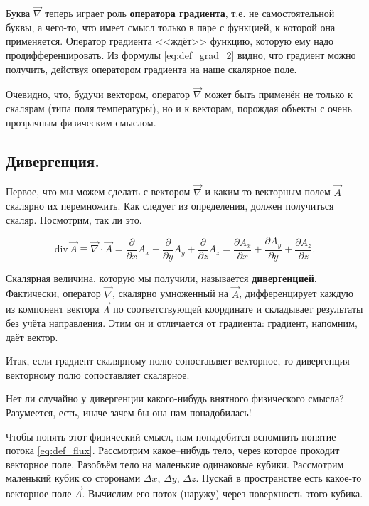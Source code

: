 \documentclass[12pt,a4paper]{article}
\numberwithin{equation}{section}
\numberwithin{equation}{section}
\newcommand{\pt}{\partial}
\renewcommand{\div}{\mathrm{div}\,}
\begin{document}
Буква $\vec{\nabla}$ теперь играет роль \textbf{оператора градиента},
т.е. не самостоятельной буквы, а чего-то, что имеет смысл только в
паре с функцией, к которой она применяется. Оператор градиента
<<ждёт>> функцию, которую ему надо продифференцировать. Из формулы
\eqref{eq:def_grad_2} видно, что градиент можно получить, действуя
оператором градиента на наше скалярное поле.

Очевидно, что, будучи вектором, оператор $\vec{\nabla}$ может быть применён
не только к скалярам (типа поля температуры), но и к векторам,
порождая объекты с очень прозрачным физическим смыслом. 

\subsection{Дивергенция.}
\label{sec:divergence}

Первое, что мы можем сделать с вектором $\vec{\nabla}$ и каким-то
векторным полем $\vec{A}$ --- скалярно их перемножить. Как следует из
определения, должен получиться скаляр. Посмотрим, так ли это.

\begin{equation}
  \label{eq:def_divergence}
  \div \vec{A} \equiv \vec{\nabla} \cdot \vec{A} = \frac{\pt}{\pt x}
  A_x +  \frac{\pt}{\pt y} A_y +  \frac{\pt}{\pt z} A_z = \frac{\pt
    A_x}{\pt x} +  \frac{\pt A_y}{\pt y} +  \frac{\pt A_z}{\pt z}.
\end{equation}

Скалярная величина, которую мы получили, называется
\textbf{дивергенцией}. Фактически, оператор $\vec{\nabla}$, скалярно
умноженный на $\vec{A}$, дифференцирует каждую из компонент вектора
$\vec{A}$ по соответствующей координате и складывает результаты без
учёта направления. Этим он и отличается от градиента: градиент,
напомним, даёт вектор. 

Итак, если градиент скалярному полю сопоставляет векторное, то
дивергенция векторному полю сопоставляет скалярное. 

Нет ли случайно у дивергенции какого-нибудь внятного физического
смысла? Разумеется, есть, иначе зачем бы она нам понадобилась!

Чтобы понять этот физический смысл, нам понадобится вспомнить понятие
потока \eqref{eq:def_flux}. Рассмотрим какое--нибудь тело, через
которое проходит векторное поле. Разобъём тело на маленькие одинаковые
кубики. Рассмотрим маленький кубик со сторонами $\Delta x$, $\Delta
y$, $\Delta z$. Пускай в пространстве есть какое-то векторное поле
$\vec{A}$. Вычислим его поток (наружу) через поверхность этого кубика.
\end{document}
